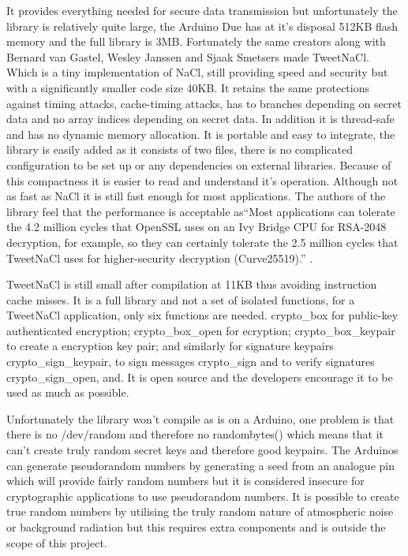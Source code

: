 It provides everything needed for secure data transmission but unfortunately the library is relatively quite large, the Arduino Due has at it's disposal 512KB flash memory and the full library is 3MB. Fortunately the same creators along with Bernard van Gastel, Wesley Janssen and Sjaak Smetsers made TweetNaCl. Which is a tiny implementation of NaCl, still providing speed and security but with a significantly smaller code size 40KB. It retains the same protections against timing attacks, cache-timing attacks, has to branches depending on secret data and no array indices depending on secret data. In addition it is thread-safe and has no dynamic memory allocation\cite{tweetnacl}. It is portable and easy to integrate, the library is easily added as it consists of two files, there is no complicated configuration to be set up or any dependencies on external libraries. Because of this compactness it is easier to read and understand it's operation. Although not as fast as NaCl it is still fast enough for most applications. The authors of the library feel that the performance is acceptable as``Most applications can tolerate the 4.2 million cycles that OpenSSL uses on an Ivy Bridge CPU for RSA-2048 decryption, for example, so they can certainly tolerate the 2.5 million cycles that TweetNaCl uses for higher-security decryption (Curve25519).'' \cite{tweetnacl3}.

TweetNaCl is still small after compilation at 11KB thus avoiding instruction cache misses. It is a full library and not a set of isolated functions, for a TweetNaCl application, only six functions are needed. crypto\_box for public-key authenticated encryption; crypto\_box\_open for ecryption; crypto\_box\_keypair to create a encryption key pair; and similarly for signature keypairs crypto\_sign\_keypair, to sign messages crypto\_sign and to verify signatures crypto\_sign\_open, and. It is open source and the developers encourage it to be used as much as possible. 

Unfortunately the library won't compile as is on a Arduino, one problem is that there is no /dev/random and therefore no randombytes() which means that it can't create truly random secret keys and therefore good keypairs. The Arduinos can generate pseudorandom numbers by generating a seed from an analogue pin which will provide fairly random numbers but it is considered insecure for cryptographic applications to use pseudorandom numbers\cite{arduinopseudo}. It is possible to create true random numbers by utilising the truly random nature of atmospheric noise or background radiation but this requires extra components and is outside the scope of this project. 


